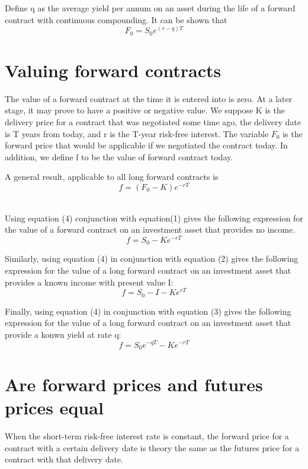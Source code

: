 \documentclass{article}
\begin{document}
Define q as the average yield per annum on an asset during the life of a forward contract with continuous compounding. It can be shown that
\begin{equation}
	F_0=S_0e^{(r-q)T}
\end{equation}

\section{Valuing forward contracts}
The value of a forward contract at the time it is entered into is zero. At a later stage, it may prove to have a positive or negative value. We suppose K is the delivery price for a contract that was negotiated some time ago, the delivery date is T years from today, and r is the T-year risk-free interest. The variable $ F_0 $ is the forward price that would be applicable if we negotiated the contract today. In addition, we define f to be the value of forward contract today.

A general result, applicable to all long forward contracts is
\begin{equation}
	f=(F_0-K)e^{-rT}
\end{equation}
\\ \hspace*{\fill}

Using equation (4) conjunction with equation(1) gives the following expression for the value of a forward contract on an investment asset that provides no income.
\begin{equation}
	f=S_0-Ke^{-rT}
\end{equation}

Similarly, using equation (4) in conjunction with equation (2) gives the following expression for the value of a long forward contract on an investment asset that provides a known income with present value I:
\begin{equation}
	f=S_0-I-Ke^{rT}
\end{equation}

Finally, using equation (4) in conjunction with equation (3) gives the following expression for the value of a long forward contract on an investment asset that provide a konwn yield at rate q:
\begin{equation}
	f=S_0e^{-qT}-Ke^{-rT}
\end{equation}

\section{Are forward prices and futures prices equal}
When the short-term risk-free interest rate is constant, the forward price for a contract with a certain delivery date is theory the same as the futures price for a contract with that delivery date.
\end{document}
